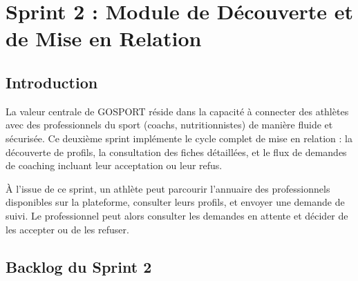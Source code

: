 \chapter{Sprint 2 : Module de Découverte et de Mise en Relation}
\minitoc
\newpage

\section{Introduction}
La valeur centrale de GOSPORT réside dans la capacité à connecter des athlètes avec des professionnels du sport (coachs, nutritionnistes) de manière fluide et sécurisée. Ce deuxième sprint implémente le cycle complet de mise en relation : la découverte de profils, la consultation des fiches détaillées, et le flux de demandes de coaching incluant leur acceptation ou leur refus.

À l'issue de ce sprint, un athlète peut parcourir l'annuaire des professionnels disponibles sur la plateforme, consulter leurs profils, et envoyer une demande de suivi. Le professionnel peut alors consulter les demandes en attente et décider de les accepter ou de les refuser.

\section{Backlog du Sprint 2}

\begin{table}[H]
\centering
\renewcommand{\arraystretch}{1.4}
\caption{Backlog du Sprint 2 -- Module de mise en relation}
\end{table}

